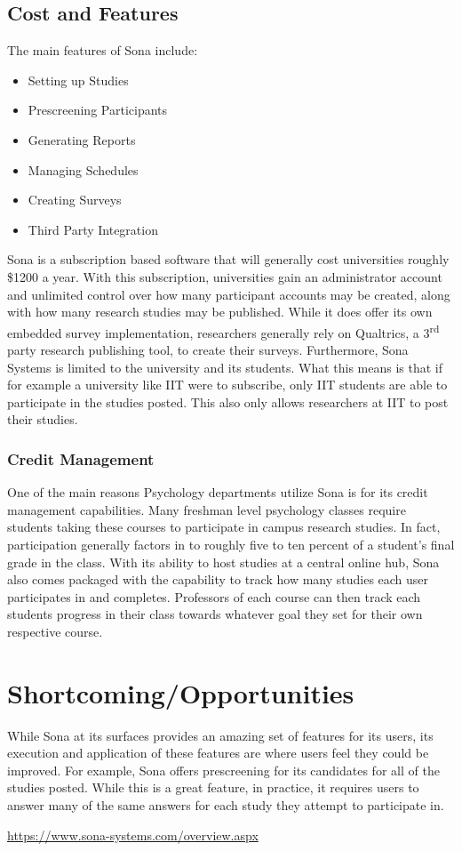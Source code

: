 \documentclass[12pt]{article}
\begin{document}
\subsection{Cost and Features}
The main features of Sona include:
\begin{itemize}
	\item Setting up Studies
	\item Prescreening Participants
	\item Generating Reports
	\item Managing Schedules
	\item Creating Surveys
	\item Third Party Integration
\end{itemize}
 Sona is a subscription based software that will generally cost universities roughly \$1200 a year. With this subscription, universities gain an administrator account and unlimited control over how many participant accounts may be created, along with how many research studies may be published. While it does offer its own embedded survey implementation, researchers generally rely on Qualtrics, a 3\textsuperscript{rd} party research publishing tool, to create their surveys. Furthermore, Sona Systems is limited to the university and its students. What this means is that if for example a university like IIT were to subscribe, only IIT students are able to participate in the studies posted. This also only allows researchers at IIT to post their studies.
\subsubsection{Credit Management}
One of the main reasons Psychology departments utilize Sona is for its credit management capabilities. Many freshman level psychology classes require students taking these courses to participate in campus research studies. In fact, participation generally factors in to roughly five to ten percent of a student's final grade in the class. With its ability to host studies at a central online hub, Sona also comes packaged with the capability to track how many studies each user participates in and completes. Professors of each course can then track each students progress in their class towards whatever goal they set for their own respective course. 
\section{Shortcoming/Opportunities}
While Sona at its surfaces provides an amazing set of features for its users, its execution and application of these features are where users feel they could be improved. For example, Sona offers prescreening for its candidates for all of the studies posted. While this is a great feature, in practice, it requires users to answer many of the same answers for each study they attempt to participate in.
\begin{thebibliography}{9}
	\url{https://www.sona-systems.com/overview.aspx}
\end{thebibliography}
\end{document}
